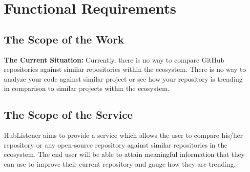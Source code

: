 \documentclass{article}
\begin{document}
\newpage
\section{Functional Requirements}

\subsection{The Scope of the Work}

\textbf{The Current Situation:} 
Currently, there is no way to compare GitHub repositories against similar repositories within the ecosystem. There is no way to analyze your code against similar project or see how your repository is trending in comparison to similar projects within the ecosystem. 


\subsection{The Scope of the Service}
HubListener aims to provide a service which allows the user to compare his/her repository or any open-source repository against similar repositories in the ecosystem. The end user will be able to attain meaningful information that they can use to improve their current repository and gauge how they are trending. 
\newline
\end{document}
